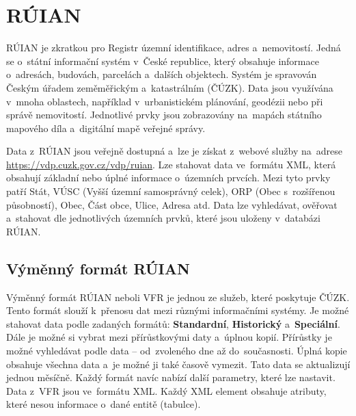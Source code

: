 \chapter{RÚIAN}
RÚIAN je zkratkou pro Registr územní identifikace, adres a~nemovitostí. 
Jedná se o~státní informační systém v~České republice, který obsahuje 
informace o~adresách, budovách, parcelách a~dalších objektech. Systém 
je spravován Českým úřadem zeměměřickým a~katastrálním (ČÚZK). 
Data jsou využívána v~mnoha oblastech, například v~urbanistickém plánování, 
geodézii nebo při správě nemovitostí. Jednotlivé prvky jsou zobrazovány na~mapách 
státního mapového díla a~digitální mapě veřejné správy. 

Data z~RÚIAN jsou veřejně dostupná a~lze je získat z~webové služby na~adrese 
\url{https://vdp.cuzk.gov.cz/vdp/ruian}. Lze stahovat data ve~formátu XML,
která obsahují základní nebo úplné informace o~územních prvcích. Mezi tyto prvky patří
Stát, VÚSC (Vyšší územní samosprávný celek), ORP (Obec s~rozšířenou
působností), Obec, Část obce, Ulice, Adresa atd.
Data lze vyhledávat, ověřovat a~stahovat dle jednotlivých územních prvků, které jsou uloženy v~databázi RÚIAN.

\section{Výměnný formát RÚIAN}
Výměnný formát RÚIAN neboli VFR je jednou ze služeb, které poskytuje
ČÚZK. Tento formát slouží k~přenosu dat mezi různými informačními systémy.
Je možné stahovat data podle zadaných formátů: \textbf{Standardní}, \textbf{Historický} a~\textbf{Speciální}.
Dále je možné si vybrat mezi přírůstkovými daty a~úplnou kopií.
Přírůstky je možné vyhledávat podle data -- od~zvoleného dne až do~současnosti.
Úplná kopie obsahuje všechna data a~je možné ji také časově vymezit. Tato data
se aktualizují jednou měsíčně.
Každý formát navíc nabízí další parametry, které lze nastavit.
Data z~VFR jsou ve~formátu XML.
Každý XML element obsahuje atributy, které nesou informace o~dané entitě (tabulce).

\newpage

